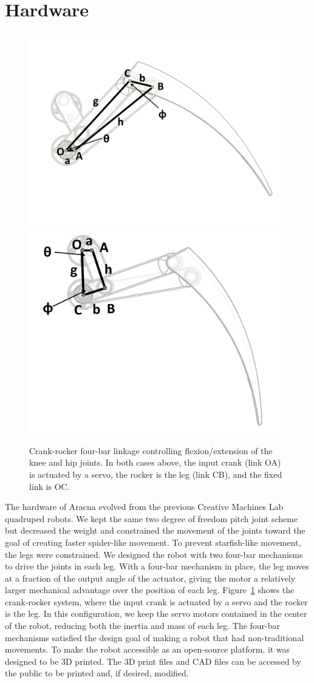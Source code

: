 \documentclass[letterpaper]{article}
\begin{document}
\section{Hardware}

\begin{figure}[t]
\begin{center}
\includegraphics[width=.23\textwidth]{fig3.pdf}
\includegraphics[width=.23\textwidth]{fig4.pdf}
\caption{Crank-rocker four-bar linkage controlling flexion/extension of
  the knee and hip joints. In both cases above, the input crank (link
  OA) is actuated by a servo, the rocker is the leg (link CB), and the
  fixed link is OC.}
\label{fig3}
\end{center}
\end{figure}


The hardware of Aracna evolved from the previous Creative Machines Lab
quadruped robots. We kept the same two degree of freedom pitch joint
scheme but decreased the weight and constrained the movement of the
joints toward the goal of creating faster spider-like movement. To
prevent starfish-like movement, the legs were constrained. We designed
the robot with two four-bar mechanisms to drive the joints in each
leg. With a four-bar mechanism in place, the leg moves at a fraction
of the output angle of the actuator, giving the motor a relatively
larger mechanical advantage over the position of each leg.
Figure~\ref{fig3} shows the crank-rocker system, where the input crank
is actuated by a servo and the rocker is the leg. In this
configuration, we keep the servo motors contained in the center of the
robot, reducing both the inertia and mass of each leg. The four-bar
mechanisms satisfied the design goal of making a robot that had
non-traditional movements.  To make the robot
accessible as an open-source platform, it was designed to be 3D
printed. The 3D print files and CAD files can be accessed by the
public to be printed and, if desired, modified.
\end{document}
